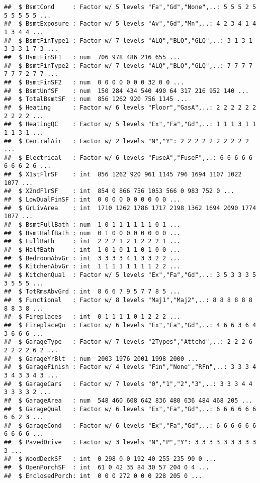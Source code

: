 \documentclass[]{article}
\begin{document}
\begin{verbatim}
##  $ BsmtCond     : Factor w/ 5 levels "Fa","Gd","None",..: 5 5 5 2 5 5 5 5 5 5 ...
##  $ BsmtExposure : Factor w/ 5 levels "Av","Gd","Mn",..: 4 2 3 4 1 4 1 3 4 4 ...
##  $ BsmtFinType1 : Factor w/ 7 levels "ALQ","BLQ","GLQ",..: 3 1 3 1 3 3 3 1 7 3 ...
##  $ BsmtFinSF1   : num  706 978 486 216 655 ...
##  $ BsmtFinType2 : Factor w/ 7 levels "ALQ","BLQ","GLQ",..: 7 7 7 7 7 7 7 2 7 7 ...
##  $ BsmtFinSF2   : num  0 0 0 0 0 0 0 32 0 0 ...
##  $ BsmtUnfSF    : num  150 284 434 540 490 64 317 216 952 140 ...
##  $ TotalBsmtSF  : num  856 1262 920 756 1145 ...
##  $ Heating      : Factor w/ 6 levels "Floor","GasA",..: 2 2 2 2 2 2 2 2 2 2 ...
##  $ HeatingQC    : Factor w/ 5 levels "Ex","Fa","Gd",..: 1 1 1 3 1 1 1 1 3 1 ...
##  $ CentralAir   : Factor w/ 2 levels "N","Y": 2 2 2 2 2 2 2 2 2 2 ...
##  $ Electrical   : Factor w/ 6 levels "FuseA","FuseF",..: 6 6 6 6 6 6 6 6 2 6 ...
##  $ X1stFlrSF    : int  856 1262 920 961 1145 796 1694 1107 1022 1077 ...
##  $ X2ndFlrSF    : int  854 0 866 756 1053 566 0 983 752 0 ...
##  $ LowQualFinSF : int  0 0 0 0 0 0 0 0 0 0 ...
##  $ GrLivArea    : int  1710 1262 1786 1717 2198 1362 1694 2090 1774 1077 ...
##  $ BsmtFullBath : num  1 0 1 1 1 1 1 1 0 1 ...
##  $ BsmtHalfBath : num  0 1 0 0 0 0 0 0 0 0 ...
##  $ FullBath     : int  2 2 2 1 2 1 2 2 2 1 ...
##  $ HalfBath     : int  1 0 1 0 1 1 0 1 0 0 ...
##  $ BedroomAbvGr : int  3 3 3 3 4 1 3 3 2 2 ...
##  $ KitchenAbvGr : int  1 1 1 1 1 1 1 1 2 2 ...
##  $ KitchenQual  : Factor w/ 5 levels "Ex","Fa","Gd",..: 3 5 3 3 3 5 3 5 5 5 ...
##  $ TotRmsAbvGrd : int  8 6 6 7 9 5 7 7 8 5 ...
##  $ Functional   : Factor w/ 8 levels "Maj1","Maj2",..: 8 8 8 8 8 8 8 8 3 8 ...
##  $ Fireplaces   : int  0 1 1 1 1 0 1 2 2 2 ...
##  $ FireplaceQu  : Factor w/ 6 levels "Ex","Fa","Gd",..: 4 6 6 3 6 4 3 6 6 6 ...
##  $ GarageType   : Factor w/ 7 levels "2Types","Attchd",..: 2 2 2 6 2 2 2 2 6 2 ...
##  $ GarageYrBlt  : num  2003 1976 2001 1998 2000 ...
##  $ GarageFinish : Factor w/ 4 levels "Fin","None","RFn",..: 3 3 3 4 3 4 3 3 4 3 ...
##  $ GarageCars   : Factor w/ 7 levels "0","1","2","3",..: 3 3 3 4 4 3 3 3 3 2 ...
##  $ GarageArea   : num  548 460 608 642 836 480 636 484 468 205 ...
##  $ GarageQual   : Factor w/ 6 levels "Ex","Fa","Gd",..: 6 6 6 6 6 6 6 6 2 3 ...
##  $ GarageCond   : Factor w/ 6 levels "Ex","Fa","Gd",..: 6 6 6 6 6 6 6 6 6 6 ...
##  $ PavedDrive   : Factor w/ 3 levels "N","P","Y": 3 3 3 3 3 3 3 3 3 3 ...
##  $ WoodDeckSF   : int  0 298 0 0 192 40 255 235 90 0 ...
##  $ OpenPorchSF  : int  61 0 42 35 84 30 57 204 0 4 ...
##  $ EnclosedPorch: int  0 0 0 272 0 0 0 228 205 0 ...

\end{verbatim}
\end{document}
